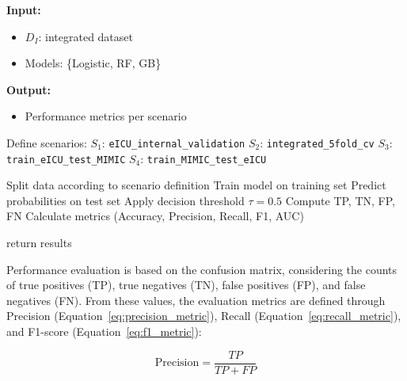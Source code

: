 \documentclass[utf8]{FrontiersinHarvard} %
\begin{document}
\begin{algorithm}
	\caption{Multi-environment modeling and evaluation protocol}
	\label{alg:modeling_evaluation_protocol}

	\textbf{Input:}
	\begin{itemize}
		\item $D_I$: integrated dataset
		\item Models: \{Logistic, RF, GB\}
	\end{itemize}

	\textbf{Output:}
	\begin{itemize}
		\item Performance metrics per scenario
	\end{itemize}

	\begin{algorithmic}[1]

		\STATE Define scenarios:
		\STATE \hspace{0.5cm} $S_1$: \texttt{eICU\_internal\_validation}
		\STATE \hspace{0.5cm} $S_2$: \texttt{integrated\_5fold\_cv}
		\STATE \hspace{0.5cm} $S_3$: \texttt{train\_eICU\_test\_MIMIC}
		\STATE \hspace{0.5cm} $S_4$: \texttt{train\_MIMIC\_test\_eICU}

		\STATE Split data according to scenario definition
		\STATE Train model on training set
		\STATE Predict probabilities on test set
		\STATE Apply decision threshold $\tau = 0.5$
		\STATE Compute TP, TN, FP, FN
		\STATE Calculate metrics (Accuracy, Precision, Recall, F1, AUC)
		\ENDFOR
		\ENDFOR

		\STATE return results

	\end{algorithmic}
\end{algorithm}

Performance evaluation is based on the confusion matrix, considering the counts of true positives (TP), true negatives (TN), false positives (FP), and false negatives (FN). From these values, the evaluation metrics are defined through Precision (Equation~\ref{eq:precision_metric}), Recall (Equation~\ref{eq:recall_metric}), and F1-score (Equation~\ref{eq:f1_metric}):

\begin{equation}
	\text{Precision} =
	\frac{TP}{TP + FP}
	\label{eq:precision_metric}
\end{equation}
\end{document}
